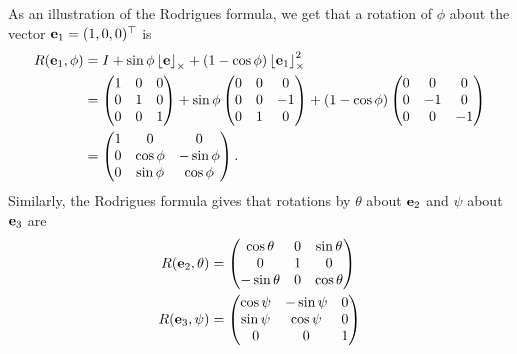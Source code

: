As an illustration of the Rodrigues formula, we get that a rotation of $\phi$ about the vector $\mathbf{e}_1=(1,0,0)^\top$ is
\begin{align*}
R(\mathbf{e}_1,\phi) &= I + \sin\phi \left\lfloor\mathbf{e}\right\rfloor_{\times} + (1-\cos\phi)\left\lfloor\mathbf{e}_1\right\rfloor_{\times}^2	\\
&= \begin{pmatrix}1 & 0 & 0 \\ 0 & 1 & 0 \\ 0 & 0 & 1 \end{pmatrix}
   +\sin\phi \begin{pmatrix} 0 & 0 & 0 \\ 0 & 0 & -1 \\ 0 & 1 & 0\end{pmatrix} 
   + (1-\cos\phi)\begin{pmatrix}0 & 0 & 0 \\ 0 & -1 & 0 \\ 0 & 0 & -1 \end{pmatrix} \\
&= \begin{pmatrix} 1 & 0 & 0 \\ 0 & \cos\phi & -\sin\phi \\ 0 & \sin\phi & \cos\phi \end{pmatrix}.
\end{align*}
Similarly, the Rodrigues formula gives that rotations by $\theta$ about $\mathbf{e}_2$ and $\psi$ about $\mathbf{e}_3$ are
\begin{align*}
R(\mathbf{e}_2, \theta) &= \begin{pmatrix} \cos\theta & 0 & \sin\theta \\ 0 & 1 & 0 \\ -\sin\theta & 0 & \cos\theta \end{pmatrix} \\
R(\mathbf{e}_3, \psi) &= \begin{pmatrix} \cos\psi & -\sin\psi & 0 \\ \sin\psi & \cos\psi & 0 \\ 0 & 0 & 1 \end{pmatrix} \\
\end{align*}

